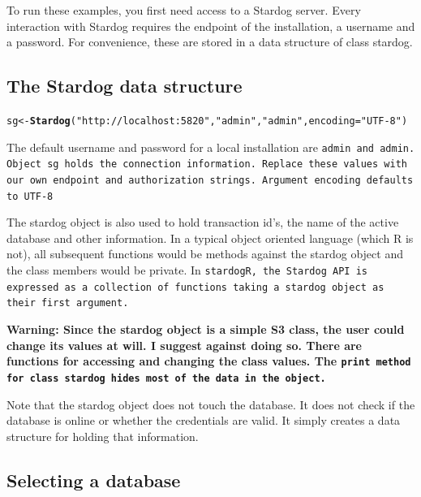 \documentclass{article}\usepackage[]{graphicx}\usepackage[]{xcolor}
\makeatletter
\newcommand{\hlstr}[1]{\textcolor[rgb]{0.192,0.494,0.8}{#1}}%
\newcommand{\hlstd}[1]{\textcolor[rgb]{0.345,0.345,0.345}{#1}}%
\newcommand{\hlkwb}[1]{\textcolor[rgb]{0.69,0.353,0.396}{#1}}%
\newcommand{\hlkwc}[1]{\textcolor[rgb]{0.333,0.667,0.333}{#1}}%
\newcommand{\hlkwd}[1]{\textcolor[rgb]{0.737,0.353,0.396}{\textbf{#1}}}%
\newenvironment{kframe}{%
 \def\at@end@of@kframe{}%
 \ifinner\ifhmode%
  \def\at@end@of@kframe{\end{minipage}}%
  \begin{minipage}{\columnwidth}%
 \fi\fi%
 \def\FrameCommand##1{\hskip\@totalleftmargin \hskip-\fboxsep
 \colorbox{shadecolor}{##1}\hskip-\fboxsep
     \hskip-\linewidth \hskip-\@totalleftmargin \hskip\columnwidth}%
 \MakeFramed {\advance\hsize-\width
   \@totalleftmargin\z@ \linewidth\hsize
   \@setminipage}}%
 {\par\unskip\endMakeFramed%
 \at@end@of@kframe}
\newenvironment{knitrout}{}{} %
\makeatother
\begin{document}
To run these examples, you first need access to a Stardog server. Every interaction with Stardog requires the endpoint of the installation, a username and a password. For convenience, these are stored in a data structure of class stardog.

\subsection{The Stardog data structure}

\begin{knitrout}
\color{fgcolor}\begin{kframe}
\begin{alltt}
\hlstd{sg} \hlkwb{<-} \hlkwd{Stardog}\hlstd{(}\hlstr{"http://localhost:5820"}\hlstd{,} \hlstr{"admin"}\hlstd{,} \hlstr{"admin"}\hlstd{,} \hlkwc{encoding} \hlstd{=} \hlstr{"UTF-8"}\hlstd{)}
\end{alltt}
\end{kframe}
\end{knitrout}

The default username and password for a local installation are \tt{admin} and \tt{admin}. Object \tt{sg} holds the connection information. Replace these values with our own endpoint and authorization strings. Argument \tt{encoding} defaults to UTF-8

The stardog object is also used to hold transaction id's, the name of the active database and other information. In a typical object oriented language (which R is not), all subsequent functions would be methods against the stardog object and the class members would be private. In \tt{stardogR}, the Stardog API is expressed as a collection of functions taking a stardog object as their first argument.

\bf{Warning:} Since the stardog object is a simple S3 class, the user could change its values at will. I suggest against doing so. There are functions for accessing and changing the class values. The \tt{print} method for class stardog hides most of the data in the object.

Note that the stardog object does not touch the database. It does not check if the database is online or whether the credentials are valid. It simply creates a data structure for holding that information.

\subsection{Selecting a database}
\end{document}
